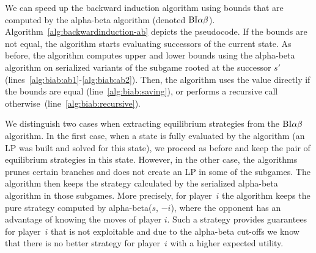 We can speed up the backward induction algorithm using bounds that are computed by the alpha-beta algorithm (denoted $\textrm{BI}\alpha\beta$).
Algorithm~\ref{alg:backwardinduction-ab} depicts the pseudocode.
If the bounds are not equal, the algorithm starts evaluating successors of the current state.
As before, the algorithm computes upper and lower bounds using the alpha-beta algorithm on serialized variants of the
subgame rooted at the successor $s'$ (lines~\ref{alg:biab:ab1}-\ref{alg:biab:ab2}).
Then, the algorithm uses the value directly if the bounds are equal (line~\ref{alg:biab:saving}), or performs a
recursive call otherwise~(line~\ref{alg:biab:recursive}).

We distinguish two cases when extracting equilibrium strategies from the $\textrm{BI}\alpha\beta$ algorithm. %
In the first case, when a state is fully evaluated by the algorithm (\ie an LP was built and solved for this state),
we proceed as before and keep the pair of equilibrium strategies in this state.
However, in the other case, the algorithms prunes certain branches and does not create an LP in some of the subgames.
The algorithm then keeps the strategy calculated by the serialized alpha-beta algorithm in those subgames.
More precisely, for player~$i$ the algorithm keeps the pure strategy computed by alpha-beta($s$, $-i$), where the opponent has an advantage of knowing the moves of player $i$.
Such a strategy provides guarantees for player~$i$ that is not exploitable and due to the alpha-beta cut-offs we know that there is no better strategy for player~$i$ with a higher expected utility.

